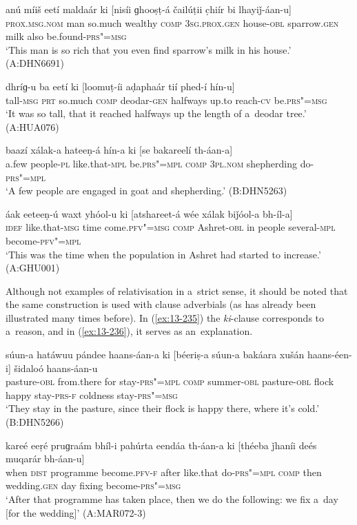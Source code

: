 \begin{exe}
\ex
\label{ex:13-231}
\gll anú míiš eetí maldaár ki [nisíi  ɡhooṣṭ-á čailúṭii c̣hiír bi lhayiǰ-áan-u] \\
\textsc{prox.msg.nom} man so.much wealthy \textsc{comp} \textsc{3sg.prox.gen }  house-\textsc{obl} sparrow.\textsc{gen} milk also be.found-\textsc{prs"=msg} \\
\glt `This man is so rich that you even find sparrow's milk in his house.' (A:DHN6691)

\ex
\label{ex:13-232}
\gll dhríɡ-u ba eetí ki [loomuṭ-íi aḍaphaár  tií phed-í hín-u] \\
tall-\textsc{msg} \textsc{prt} so.much \textsc{comp} deodar-\textsc{gen} halfways up.to reach-\textsc{cv} be.\textsc{prs"=msg} \\
\glt `It was so tall, that it reached halfways up the length of a~deodar tree.' (A:HUA076)

\ex
\label{ex:13-233}
\gll baazí xálak-a hateeṇ-á hín-a ki  [se bakareelí th-áan-a]  \\
a.few people-\textsc{pl}  like.that-\textsc{mpl} be.\textsc{prs"=mpl} \textsc{comp}  \textsc{3pl.nom}  shepherding do-\textsc{prs"=mpl} \\
\glt `A few people are engaged in goat and shepherding.' (B:DHN5263)

\ex
\label{ex:13-234}
\gll áak eeteeṇ-ú waxt yhóol-u ki  [atshareet-á wée xálak biǰóol-a bh-íl-a] \\
\textsc{idef} like.that-\textsc{msg} time come.\textsc{pfv"=msg} \textsc{comp} Ashret-\textsc{obl} in people several-\textsc{mpl} become-\textsc{pfv"=mpl} \\
\glt `This was the time when the population in Ashret had started to increase.' (A:GHU001) 
\end{exe}

Although not examples of relativisation in a~strict sense, it should be noted that the same construction is used with clause adverbials (as has already been illustrated many times before). In (\ref{ex:13-235}) the \textit{ki}-clause corresponds to a~reason, and in (\ref{ex:13-236}), it serves as an~explanation.

\begin{exe}
\ex
\label{ex:13-235}
\gll súun-a hatáwuu pándee haans-áan-a ki  [béeriṣ-a súun-a bakáara
  xušán haans-éen-i]  šidaloó haans-áan-u \\
pasture-\textsc{obl} from.there for stay-\textsc{prs"=mpl} \textsc{comp}  summer-\textsc{obl} pasture-\textsc{obl} flock happy stay-\textsc{prs-f} coldness stay-\textsc{prs"=msg} \\
\glt `They stay in the pasture, since their flock is happy there, where it's cold.' (B:DHN5266)

\ex
\label{ex:13-236}
\gll kareé eeṛé pruɡraám bhíl-i pahúrta eendáa  th-áan-a ki [théeba
  ǰhaníi deés muqarár  bh-áan-u] \\
when \textsc{dist} programme become.\textsc{pfv-f} after like.that  do-\textsc{prs"=mpl} \textsc{comp} then wedding.\textsc{gen} day fixing become-\textsc{prs"=msg} \\
\glt `After that programme has taken place, then we do the following: we fix a~day [for the wedding]' (A:MAR072-3)
\end{exe}